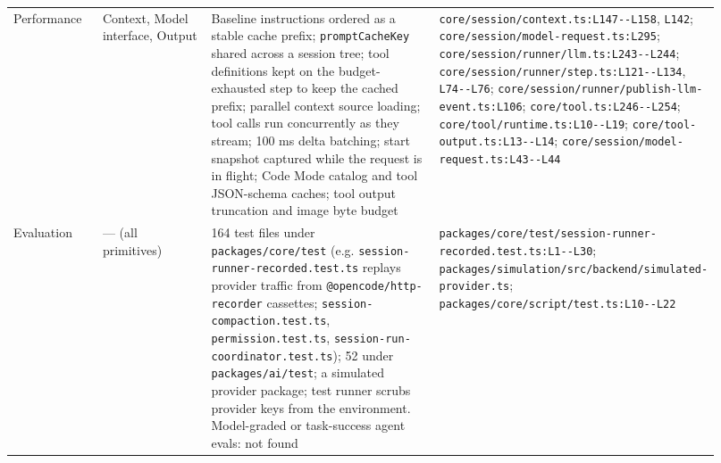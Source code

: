 \begin{longtable}{@{}p{0.13\linewidth}p{0.17\linewidth}p{0.36\linewidth}p{0.26\linewidth}@{}}
Performance & Context, Model interface, Output & Baseline instructions ordered as a stable cache prefix; \texttt{promptCacheKey} shared across a session tree; tool definitions kept on the budget-exhausted step to keep the cached prefix; parallel context source loading; tool calls run concurrently as they stream; 100 ms delta batching; start snapshot captured while the request is in flight; Code Mode catalog and tool JSON-schema caches; tool output truncation and image byte budget & \texttt{core/\allowbreak{}session/\allowbreak{}context.\allowbreak{}ts:\allowbreak{}L147-\allowbreak{}-\allowbreak{}L158}, \texttt{L142}; \texttt{core/\allowbreak{}session/\allowbreak{}model-\allowbreak{}request.\allowbreak{}ts:\allowbreak{}L295}; \texttt{core/\allowbreak{}session/\allowbreak{}runner/\allowbreak{}llm.\allowbreak{}ts:\allowbreak{}L243-\allowbreak{}-\allowbreak{}L244}; \texttt{core/\allowbreak{}session/\allowbreak{}runner/\allowbreak{}step.\allowbreak{}ts:\allowbreak{}L121-\allowbreak{}-\allowbreak{}L134}, \texttt{L74-\allowbreak{}-\allowbreak{}L76}; \texttt{core/\allowbreak{}session/\allowbreak{}runner/\allowbreak{}publish-\allowbreak{}llm-\allowbreak{}event.\allowbreak{}ts:\allowbreak{}L106}; \texttt{core/\allowbreak{}tool.\allowbreak{}ts:\allowbreak{}L246-\allowbreak{}-\allowbreak{}L254}; \texttt{core/\allowbreak{}tool/\allowbreak{}runtime.\allowbreak{}ts:\allowbreak{}L10-\allowbreak{}-\allowbreak{}L19}; \texttt{core/\allowbreak{}tool-\allowbreak{}output.\allowbreak{}ts:\allowbreak{}L13-\allowbreak{}-\allowbreak{}L14}; \texttt{core/\allowbreak{}session/\allowbreak{}model-\allowbreak{}request.\allowbreak{}ts:\allowbreak{}L43-\allowbreak{}-\allowbreak{}L44} \\
Evaluation & --- (all primitives) & 164 test files under \texttt{packages/\allowbreak{}core/\allowbreak{}test} (e.g. \texttt{session-\allowbreak{}runner-\allowbreak{}recorded.\allowbreak{}test.\allowbreak{}ts} replays provider traffic from \texttt{@opencode/\allowbreak{}http-\allowbreak{}recorder} cassettes; \texttt{session-\allowbreak{}compaction.\allowbreak{}test.\allowbreak{}ts}, \texttt{permission.\allowbreak{}test.\allowbreak{}ts}, \texttt{session-\allowbreak{}run-\allowbreak{}coordinator.\allowbreak{}test.\allowbreak{}ts}); 52 under \texttt{packages/\allowbreak{}ai/\allowbreak{}test}; a simulated provider package; test runner scrubs provider keys from the environment. Model-graded or task-success agent evals: not found & \texttt{packages/\allowbreak{}core/\allowbreak{}test/\allowbreak{}session-\allowbreak{}runner-\allowbreak{}recorded.\allowbreak{}test.\allowbreak{}ts:\allowbreak{}L1-\allowbreak{}-\allowbreak{}L30}; \texttt{packages/\allowbreak{}simulation/\allowbreak{}src/\allowbreak{}backend/\allowbreak{}simulated-\allowbreak{}provider.\allowbreak{}ts}; \texttt{packages/\allowbreak{}core/\allowbreak{}script/\allowbreak{}test.\allowbreak{}ts:\allowbreak{}L10-\allowbreak{}-\allowbreak{}L22} \\
\bottomrule \end{longtable}

